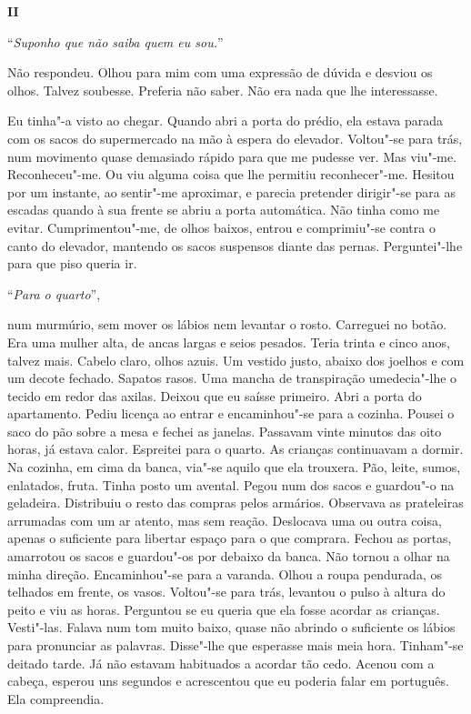 \pagebreak

\vspace*{1.8cm}
\noindent{}\textbf{II}

\bigskip

``\emph{Suponho que não saiba quem eu sou.}''

Não respondeu. Olhou para mim com uma expressão de dúvida e desviou os
olhos. Talvez soubesse. Preferia não saber. Não era nada que lhe
interessasse.

Eu tinha"-a visto ao chegar. Quando abri a porta do prédio, ela estava
parada com os sacos do supermercado na mão à espera do elevador.
Voltou"-se para trás, num movimento quase demasiado rápido para que me
pudesse ver. Mas viu"-me. Reconheceu"-me. Ou viu alguma coisa que lhe
permitiu reconhecer"-me. Hesitou por um instante, ao sentir"-me
aproximar, e parecia pretender dirigir"-se para as escadas quando à sua
frente se abriu a porta automática. Não tinha como me evitar.
Cumprimentou"-me, de olhos baixos, entrou e comprimiu"-se contra o canto
do elevador, mantendo os sacos suspensos diante das pernas.
Perguntei"-lhe para que piso queria ir.

``\emph{Para o quarto}'',

num murmúrio, sem mover os lábios nem levantar o rosto. Carreguei no
botão. Era uma mulher alta, de ancas largas e seios pesados. Teria
trinta e cinco anos, talvez mais. Cabelo claro, olhos azuis. Um vestido
justo, abaixo dos joelhos e com um decote fechado. Sapatos rasos. Uma
mancha de transpiração umedecia"-lhe o tecido em redor das axilas.
Deixou que eu saísse primeiro. Abri a porta do apartamento. Pediu
licença ao entrar e encaminhou"-se para a cozinha. Pousei o saco do pão
sobre a mesa e fechei as janelas. Passavam vinte minutos das oito horas,
já estava calor. Espreitei para o quarto. As crianças continuavam a
dormir. Na cozinha, em cima da banca, via"-se aquilo que ela trouxera.
Pão, leite, sumos, enlatados, fruta. Tinha posto um avental. Pegou num
dos sacos e guardou"-o na geladeira. Distribuiu o resto das compras
pelos armários. Observava as prateleiras arrumadas com um ar atento, mas
sem reação. Deslocava uma ou outra coisa, apenas o suficiente para
libertar espaço para o que comprara. Fechou as portas, amarrotou os
sacos e guardou"-os por debaixo da banca. Não tornou a olhar na minha
direção. Encaminhou"-se para a varanda. Olhou a roupa pendurada, os
telhados em frente, os vasos. Voltou"-se para trás, levantou o pulso à
altura do peito e viu as horas. Perguntou se eu queria que ela fosse
acordar as crianças. Vesti"-las. Falava num tom muito baixo, quase não
abrindo o suficiente os lábios para pronunciar as palavras. Disse"-lhe
que esperasse mais meia hora. Tinham"-se deitado tarde. Já não estavam
habituados a acordar tão cedo. Acenou com a cabeça, esperou uns segundos
e acrescentou que eu poderia falar em português. Ela compreendia.

